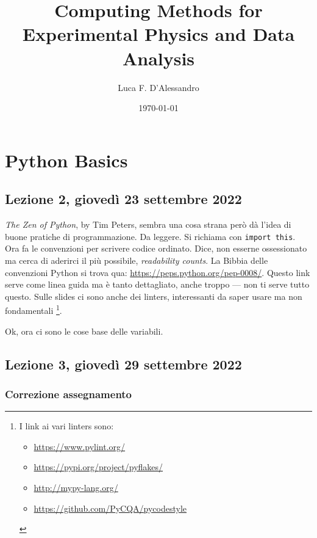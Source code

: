 \documentclass[10pt, a4paper, titlepage]{book}
\title{Computing Methods for Experimental Physics and Data Analysis}
\author{Luca F. D'Alessandro}
\date{\today}
\begin{document}
\maketitle

\tableofcontents

\chapter{Python Basics}

\section{Lezione 2, giovedì 23 settembre 2022}

\emph{The Zen of Python}, by Tim Peters, sembra una cosa strana però dà l'idea di buone pratiche di programmazione. Da leggere. Si richiama con \texttt{import this}.
Ora fa le convenzioni per scrivere codice ordinato. Dice, non esserne ossessionato ma cerca di aderirci il più possibile, \textit{readability counts}.
La Bibbia delle convenzioni Python si trova qua: \url{https://peps.python.org/pep-0008/}. 
Questo link serve come linea guida ma è tanto dettagliato, anche troppo --- non ti serve tutto questo.
Sulle slides ci sono anche dei linters, interessanti da saper usare ma non fondamentali
\footnote{
I link ai vari linters sono: 
	\begin{itemize}
		\item \url{https://www.pylint.org/}
		\item \url{https://pypi.org/project/pyflakes/}
		\item \url{http://mypy-lang.org/}
		\item \url{https://github.com/PyCQA/pycodestyle}
	\end{itemize}
}.


Ok, ora ci sono le cose base delle variabili.



\section{Lezione 3, giovedì 29 settembre 2022}

\subsection{Correzione assegnamento}
\end{document}
